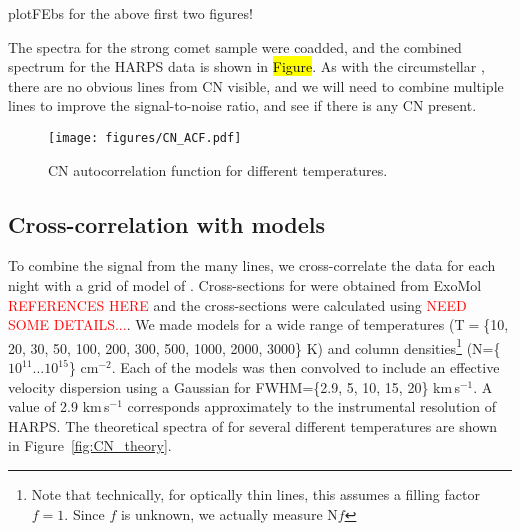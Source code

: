 \documentclass{aa}
\begin{document}
plotFEbs for the above first two figures!

The spectra for the strong comet sample were coadded, and the combined spectrum for the HARPS data is shown in \hl{Figure}. As with the circumstellar , there are no obvious lines from CN visible, and we will need to combine multiple lines to improve the signal-to-noise ratio, and see if there is any CN present. 
%
%
%
%

\begin{figure}
    \begin{centering}
        \texttt{[image: figures/CN\_ACF.pdf]}
        \caption{CN autocorrelation function for different temperatures.}
        \label{fig:CN_ACF}
    \end{centering}
\end{figure}





\subsection{Cross-correlation with  models}\label{sect:CCF}
To combine the signal from the many  lines, we cross-correlate the data for each night with a grid of model of . Cross-sections for  were obtained from ExoMol \textcolor{red}{REFERENCES HERE} and the cross-sections were calculated using \textcolor{red}{NEED SOME DETAILS...}. We made models for a wide range of temperatures (T$=$\{10, 20, 30, 50, 100, 200, 300, 500, 1000, 2000, 3000\} K) and column densities\footnote{Note that technically, for optically thin lines, this assumes a filling factor $f=1$. Since $f$ is unknown, we actually measure N$f$} (N=\{$10^{11} \ldots 10^{15}$\} cm$^{-2}$. Each of the models was then convolved to include an effective velocity dispersion using a Gaussian for FWHM=\{2.9, 5, 10, 15, 20\} km\,s$^{-1}$. A value of 2.9 km\,s$^{-1}$ corresponds approximately to the instrumental resolution of HARPS. The theoretical spectra of  for several different temperatures are shown in Figure~\ref{fig:CN_theory}.
\end{document}
